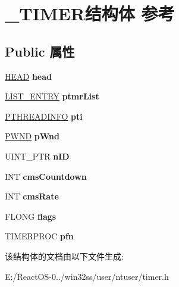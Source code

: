 \hypertarget{struct___t_i_m_e_r}{}\section{\+\_\+\+T\+I\+M\+E\+R结构体 参考}
\label{struct___t_i_m_e_r}
\subsection*{Public 属性}
\begin{DoxyCompactItemize}
\item 
\mbox{\label{struct___t_i_m_e_r_a5475de62b0acbde6e3666e26874cb33e}} 
\hyperlink{struct___h_e_a_d}{H\+E\+AD} {\bfseries head}
\item 
\mbox{\label{struct___t_i_m_e_r_ad37c862e73081766cd49c126255b218c}} 
\hyperlink{struct___l_i_s_t___e_n_t_r_y}{L\+I\+S\+T\+\_\+\+E\+N\+T\+RY} {\bfseries ptmr\+List}
\item 
\mbox{\label{struct___t_i_m_e_r_adeca40dd04240d8c3f263bb7d5bcfdf4}} 
\hyperlink{struct___t_h_r_e_a_d_i_n_f_o}{P\+T\+H\+R\+E\+A\+D\+I\+N\+FO} {\bfseries pti}
\item 
\mbox{\label{struct___t_i_m_e_r_aabc34189d9c9f5c8a22bfc4dbd317bfd}} 
\hyperlink{struct___w_n_d}{P\+W\+ND} {\bfseries p\+Wnd}
\item 
\mbox{\label{struct___t_i_m_e_r_a6c2d710d028e2f667274244e92797c98}} 
U\+I\+N\+T\+\_\+\+P\+TR {\bfseries n\+ID}
\item 
\mbox{\label{struct___t_i_m_e_r_add330603fb7c2a858dc3ebbc0f5cb9ee}} 
I\+NT {\bfseries cms\+Countdown}
\item 
\mbox{\label{struct___t_i_m_e_r_a42c97921cfb44900b649b6e064f7f0b1}} 
I\+NT {\bfseries cms\+Rate}
\item 
\mbox{\label{struct___t_i_m_e_r_aff8a83d1b73e1e1c3988736bc16581d1}} 
F\+L\+O\+NG {\bfseries flags}
\item 
\mbox{\label{struct___t_i_m_e_r_a5fc142cff59675266c24e367379e14e8}} 
T\+I\+M\+E\+R\+P\+R\+OC {\bfseries pfn}
\end{DoxyCompactItemize}


该结构体的文档由以下文件生成\+:\begin{DoxyCompactItemize}
\item 
E\+:/\+React\+O\+S-\/0../win32ss/user/ntuser/timer.\+h\end{DoxyCompactItemize}
